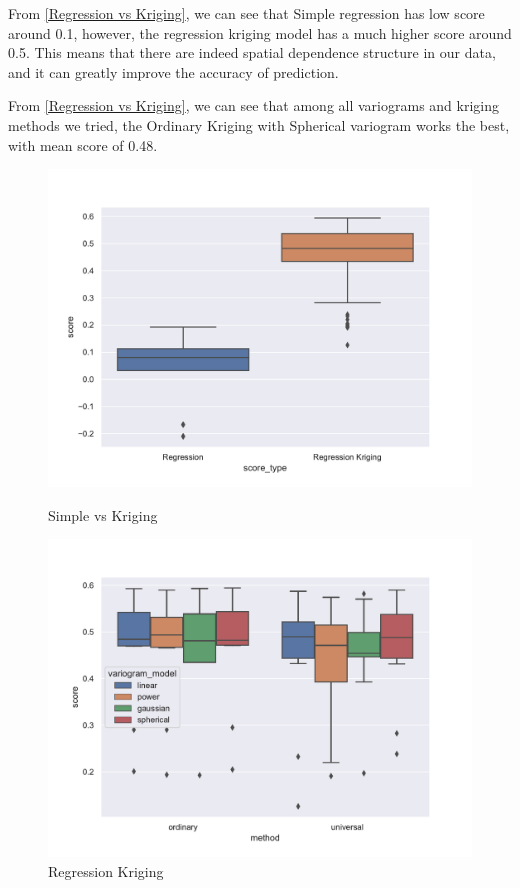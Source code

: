 \documentclass{article}
\begin{document}
From \cref{Regression vs Kriging}, we can see that Simple regression has low score around 0.1, however, the regression kriging model has a much higher score around 0.5. This means that there are indeed spatial dependence structure in our data, and it can greatly improve the accuracy of prediction. 

From \cref{Regression vs Kriging}, we can see that among all variograms and kriging methods we tried, the Ordinary Kriging with Spherical variogram works the best, with mean score of 0.48. 

\begin{figure}[htbp]
    \centering
    \begin{minipage}{0.5\textwidth}
        \includegraphics[width=\textwidth]{fig/Regression vs Regression Kriging.pdf}
        \caption{Simple vs Kriging}
        \label{Regression vs Kriging}
    \end{minipage}\hfill
    \begin{minipage}{0.5\textwidth}
        \includegraphics[width=\textwidth]{fig/Regression Kriging.pdf}
        \caption{Regression Kriging}
        \label{Regression Kriging}
    \end{minipage}
\end{figure}
\end{document}
